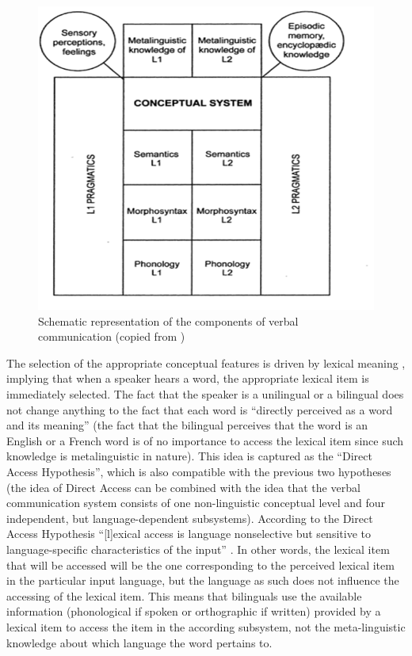 \begin{figure}
\includegraphics[height=.3\textheight]{figures/Vandevoorde2-img94.png}
\caption{\label{fig:key:91}  Schematic representation of the components of verbal communication (copied from \citealt[227]{paradis_neurolinguistic_2004})}
\end{figure}

The selection of the appropriate conceptual features is driven by lexical meaning \citep[203]{paradis_neurolinguistic_2004}, implying that when a speaker hears a word, the appropriate lexical item is immediately selected. The fact that the speaker is a unilingual or a bilingual does not change anything to the fact that each word is “directly perceived as a word and its meaning” \citep[203]{paradis_neurolinguistic_2004} (the fact that the bilingual perceives that the word is an English or a French word is of no importance to access the lexical item since such knowledge is metalinguistic in nature). This idea is captured as the “Direct Access Hypothesis”, which is also compatible with the previous two hypotheses (the idea of Direct Access can be combined with the idea that the verbal communication system consists of one non-linguistic conceptual level and four independent, but language-dependent subsystems). According to the Direct Access Hypothesis “[l]exical access is language nonselective but sensitive to language-specific characteristics of the input” \citep[205]{paradis_neurolinguistic_2004}. In other words, the lexical item that will be accessed will be the one corresponding to the perceived lexical item in the particular input language, but the language as such does not influence the accessing of the lexical item. This means that bilinguals use the available information (phonological if spoken or orthographic if written) provided by a lexical item to access the item in the according subsystem, not the meta-linguistic knowledge about which language the word pertains to.

